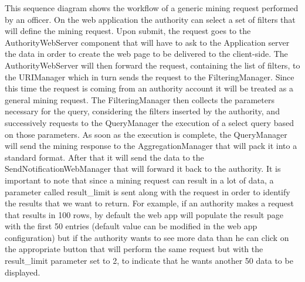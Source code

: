 This sequence diagram shows the workflow of a generic mining request performed by an officer. On the web application the authority can select a set of filters that will define the mining request. Upon submit, the request goes to the AuthorityWebServer component that will have to ask to the Application server the data in order to create the web page to be delivered to the client-side. The AuthorityWebServer will then forward the request, containing the list of filters, to the URIManager which in turn sends the request to the FilteringManager. Since this time the request is coming from an authority account it will be treated as a general mining request. The FilteringManager then collects the parameters necessary for the query, considering the filters inserted by the authority, and successively requests to the QueryManager the execution of a select query based on those parameters. As soon as the execution is complete, the QueryManager will send the mining response to the AggregationManager that will pack it into a standard format. After that it will send the data to the SendNotificationWebManager that will forward it back to the authority. It is important to note that since a mining request can result in a lot of data, a parameter called result\_limit is sent along with the request in order to identify the results that we want to return. For example, if an authority makes a request that results in 100 rows, by default the web app will populate the result page with the first 50 entries (default value can be modified in the web app configuration) but if the authority wants to see more data than he can click on the appropriate button that will perform the same request but with the result\_limit parameter set to 2, to indicate that he wants another 50 data to be displayed. 
